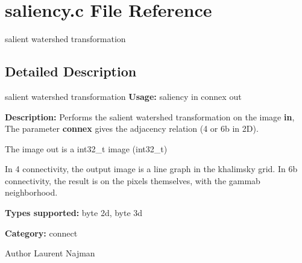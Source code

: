 \section{saliency.c File Reference}
\label{saliency_8c}


salient watershed transformation  




\subsection{Detailed Description}
salient watershed transformation {\bfseries Usage:} saliency in connex out

{\bfseries Description:} Performs the salient watershed transformation on the image {\bfseries in}, The parameter {\bfseries connex} gives the adjacency relation (4 or 6b in 2D).

The image out is a int32\_\-t image (int32\_\-t)

In 4 connectivity, the output image is a line graph in the khalimsky grid. In 6b connectivity, the result is on the pixels themselves, with the gammab neighborhood.

{\bfseries Types supported:} byte 2d, byte 3d

{\bfseries Category:} connect

\begin{DoxyAuthor}{Author}
Laurent Najman 
\end{DoxyAuthor}
